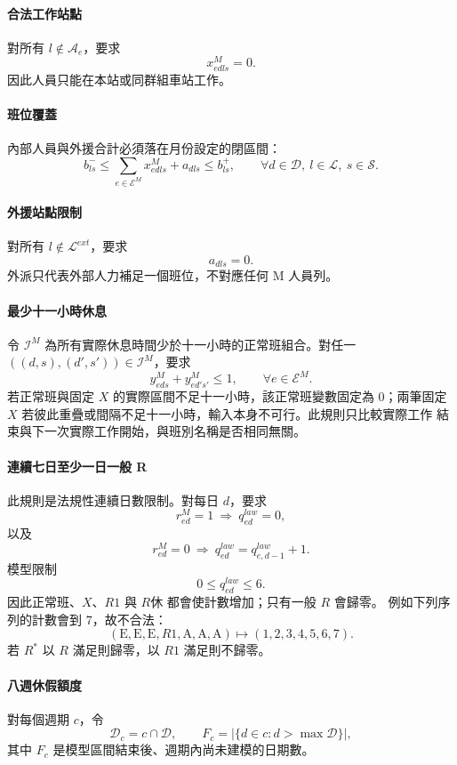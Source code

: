 \documentclass[a4paper,12pt]{article}
\begin{document}
\paragraph{合法工作站點}
對所有 \(l\notin\mathcal{A}_e\)，要求
\[
  x^{M}_{edls}=0.
\]
因此人員只能在本站或同群組車站工作。

\paragraph{班位覆蓋}
內部人員與外援合計必須落在月份設定的閉區間：
\[
  b^-_{ls}\le
  \sum_{e\in\mathcal{E}^{M}}x^{M}_{edls}+a_{dls}
  \le b^+_{ls},
  \qquad
  \forall d\in\mathcal{D},\ l\in\mathcal{L},\ s\in\mathcal{S}.
\]

\paragraph{外援站點限制}
對所有 \(l\notin\mathcal{L}^{ext}\)，要求
\[
  a_{dls}=0.
\]
外派只代表外部人力補足一個班位，不對應任何 M 人員列。

\paragraph{最少十一小時休息}
令 \(\mathcal{I}^{M}\) 為所有實際休息時間少於十一小時的正常班組合。對任一
\(((d,s),(d',s'))\in\mathcal{I}^{M}\)，要求
\[
  y^{M}_{eds}+y^{M}_{ed's'}\leq1,
  \qquad
  \forall e\in\mathcal{E}^{M}.
\]
若正常班與固定 \(X\) 的實際區間不足十一小時，該正常班變數固定為 0；兩筆固定
\(X\) 若彼此重疊或間隔不足十一小時，輸入本身不可行。此規則只比較實際工作
結束與下一次實際工作開始，與班別名稱是否相同無關。

\paragraph{連續七日至少一日一般 R}
此規則是法規性連續日數限制。對每日 \(d\)，要求
\[
  r^{M}_{ed}=1
  \ \Longrightarrow\ 
  q^{law}_{ed}=0,
\]
以及
\[
  r^{M}_{ed}=0
  \ \Longrightarrow\ 
  q^{law}_{ed}=q^{law}_{e,d-1}+1.
\]
模型限制
\[
  0\leq q^{law}_{ed}\leq6.
\]
因此正常班、\(X\)、\(R1\) 與 \(R休\) 都會使計數增加；只有一般 \(R\) 會歸零。
例如下列序列的計數會到 7，故不合法：
\[
  (\mathrm{E},\mathrm{E},\mathrm{E},R1,\mathrm{A},\mathrm{A},\mathrm{A})
  \longmapsto (1,2,3,4,5,6,7).
\]
若 \(R^*\) 以 \(R\) 滿足則歸零，以 \(R1\) 滿足則不歸零。

\paragraph{八週休假額度}
對每個週期 \(c\)，令
\[
  \mathcal{D}_c=c\cap\mathcal{D},
  \qquad
  F_c=\left|\{d\in c:d>\max\mathcal{D}\}\right|,
\]
其中 \(F_c\) 是模型區間結束後、週期內尚未建模的日期數。
\end{document}
